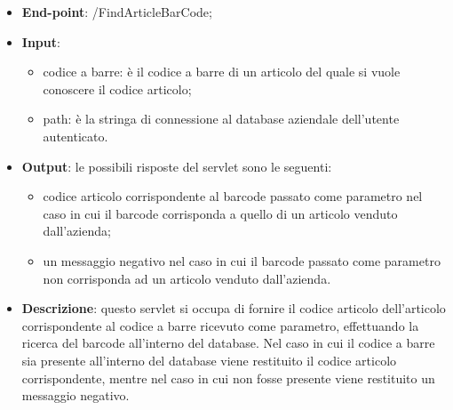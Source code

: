 \begin{itemize}
	\item \textbf{End-point}: /FindArticleBarCode;
	\item \textbf{Input}:
		\begin{itemize}
			\item codice a barre: è il codice a barre di un articolo del quale si vuole conoscere il codice articolo;
			\item path: è la stringa di connessione al database aziendale dell'utente autenticato.
		\end{itemize}
	\item \textbf{Output}: le possibili risposte del servlet sono le seguenti:
		\begin{itemize}
			\item codice articolo corrispondente al barcode passato come parametro nel caso in cui il barcode corrisponda a quello di un articolo venduto dall'azienda;
			\item un messaggio negativo nel caso in cui il barcode passato come parametro non corrisponda ad un articolo venduto dall'azienda.
		\end{itemize}
	\item \textbf{Descrizione}: questo servlet si occupa di fornire il codice articolo dell'articolo corrispondente al codice a barre ricevuto come parametro, effettuando la ricerca del barcode all'interno del database. Nel caso in cui il codice a barre sia presente all'interno del database viene restituito il codice articolo corrispondente, mentre nel caso in cui non fosse presente viene restituito un messaggio negativo.
\end{itemize}


